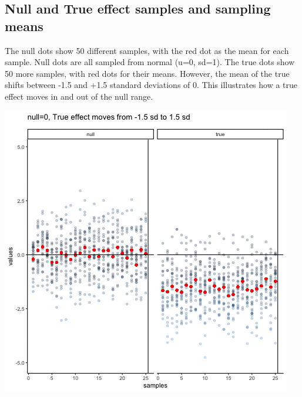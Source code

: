 \documentclass[]{book}
\begin{document}
\hypertarget{null-and-true-effect-samples-and-sampling-means}{%
\subsection{Null and True effect samples and sampling means}\label{null-and-true-effect-samples-and-sampling-means}}

The null dots show 50 different samples, with the red dot as the mean for each sample. Null dots are all sampled from normal (u=0, sd=1). The true dots show 50 more samples, with red dots for their means. However, the mean of the true shifts between -1.5 and +1.5 standard deviations of 0. This illustrates how a true effect moves in and out of the null range.

\includegraphics{gifs/sampleNullTrue-1.gif}
\end{document}
